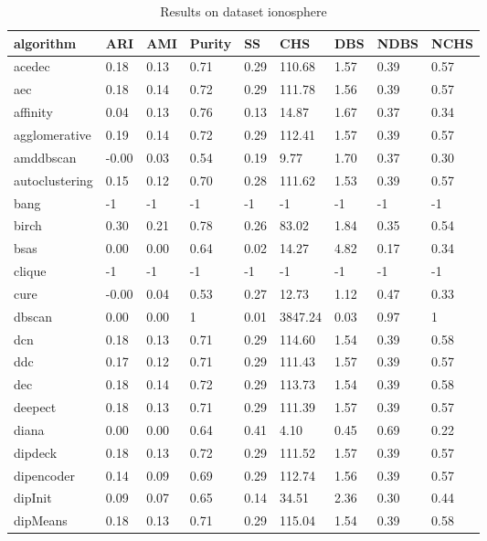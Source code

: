 \begin{table}[H]
\centering
\caption{Results on dataset ionosphere}
\label{S64_Table}
\begin{tabular}{|l|l|l|l|l|l|l|l|l|}
\hline
algorithm & ARI & AMI & Purity & SS & CHS & DBS & NDBS & NCHS \\
\hline
acedec & 0.18 & 0.13 & 0.71 & 0.29 & 110.68 & 1.57 & 0.39 & 0.57 \\
\hline
aec & 0.18 & 0.14 & 0.72 & 0.29 & 111.78 & 1.56 & 0.39 & 0.57 \\
\hline
affinity & 0.04 & 0.13 & 0.76 & 0.13 & 14.87 & 1.67 & 0.37 & 0.34 \\
\hline
agglomerative & 0.19 & 0.14 & 0.72 & 0.29 & 112.41 & 1.57 & 0.39 & 0.57 \\
\hline
amddbscan & -0.00 & 0.03 & 0.54 & 0.19 & 9.77 & 1.70 & 0.37 & 0.30 \\
\hline
autoclustering & 0.15 & 0.12 & 0.70 & 0.28 & 111.62 & 1.53 & 0.39 & 0.57 \\
\hline
bang & -1 & -1 & -1 & -1 & -1 & -1 & -1 & -1 \\
\hline
birch & 0.30 & 0.21 & 0.78 & 0.26 & 83.02 & 1.84 & 0.35 & 0.54 \\
\hline
bsas & 0.00 & 0.00 & 0.64 & 0.02 & 14.27 & 4.82 & 0.17 & 0.34 \\
\hline
clique & -1 & -1 & -1 & -1 & -1 & -1 & -1 & -1 \\
\hline
cure & -0.00 & 0.04 & 0.53 & 0.27 & 12.73 & 1.12 & 0.47 & 0.33 \\
\hline
dbscan & 0.00 & 0.00 & 1 & 0.01 & 3847.24 & 0.03 & 0.97 & 1 \\
\hline
dcn & 0.18 & 0.13 & 0.71 & 0.29 & 114.60 & 1.54 & 0.39 & 0.58 \\
\hline
ddc & 0.17 & 0.12 & 0.71 & 0.29 & 111.43 & 1.57 & 0.39 & 0.57 \\
\hline
dec & 0.18 & 0.14 & 0.72 & 0.29 & 113.73 & 1.54 & 0.39 & 0.58 \\
\hline
deepect & 0.18 & 0.13 & 0.71 & 0.29 & 111.39 & 1.57 & 0.39 & 0.57 \\
\hline
diana & 0.00 & 0.00 & 0.64 & 0.41 & 4.10 & 0.45 & 0.69 & 0.22 \\
\hline
dipdeck & 0.18 & 0.13 & 0.72 & 0.29 & 111.52 & 1.57 & 0.39 & 0.57 \\
\hline
dipencoder & 0.14 & 0.09 & 0.69 & 0.29 & 112.74 & 1.56 & 0.39 & 0.57 \\
\hline
dipInit & 0.09 & 0.07 & 0.65 & 0.14 & 34.51 & 2.36 & 0.30 & 0.44 \\
\hline
dipMeans & 0.18 & 0.13 & 0.71 & 0.29 & 115.04 & 1.54 & 0.39 & 0.58 \\

\end{tabular}
\end{table}
